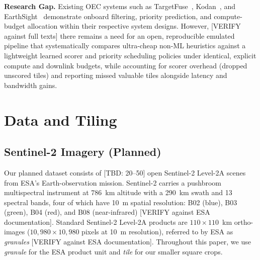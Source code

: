 \documentclass[conference]{IEEEtran}
\begin{document}
\textbf{Research Gap.} Existing OEC systems such as TargetFuse~\cite{targetfuse}, Kodan~\cite{kodan}, and EarthSight~\cite{earthsight} demonstrate onboard filtering, priority prediction, and compute-budget allocation within their respective system designs. However, [VERIFY against full texts] there remains a need for an open, reproducible emulated pipeline that systematically compares ultra-cheap non-ML heuristics against a lightweight learned scorer and priority scheduling policies under identical, explicit compute and downlink budgets, while accounting for scorer overhead (dropped unscored tiles) and reporting missed valuable tiles alongside latency and bandwidth gains.

\section{Data and Tiling}

\subsection{Sentinel-2 Imagery (Planned)}
Our planned dataset consists of [TBD: 20--50] open Sentinel-2 Level-2A scenes from ESA's Earth-observation mission. Sentinel-2 carries a pushbroom multispectral instrument at 786~km altitude with a 290~km swath and 13 spectral bands, four of which have 10~m spatial resolution: B02 (blue), B03 (green), B04 (red), and B08 (near-infrared) [VERIFY against ESA documentation]. Standard Sentinel-2 Level-2A products are $110\times110$~km ortho-images ($10{,}980\times10{,}980$ pixels at 10~m resolution), referred to by ESA as \emph{granules} [VERIFY against ESA documentation]. Throughout this paper, we use \emph{granule} for the ESA product unit and \emph{tile} for our smaller square crops.
\end{document}
